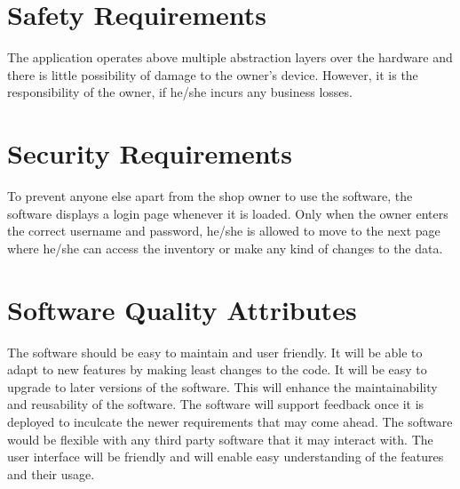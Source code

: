 \documentclass{scrreprt}
\begin{document}
\section{Safety Requirements}
The application operates above multiple abstraction layers over the hardware and there is little possibility of damage to the owner's device. However, it is the responsibility of the owner, if he/she incurs any business losses.

\section{Security Requirements}
To prevent anyone else apart from the shop owner to use the software, the software displays a login page whenever it is loaded. Only when the owner enters the correct username and password, he/she is allowed to move to the next page where he/she can access the inventory or make any kind of changes to the data.

\section{Software Quality Attributes}

The software should be easy to maintain and user friendly. It will be able to adapt to new features by making least changes to the code. It will be easy to upgrade to later versions of the software. This will enhance the maintainability and reusability of the software. The software will support feedback once it is deployed to inculcate the newer requirements that may come ahead. The software would be flexible with any third party software that it may interact with. The user interface will be friendly and will enable easy understanding of the features and their usage.
\end{document}
